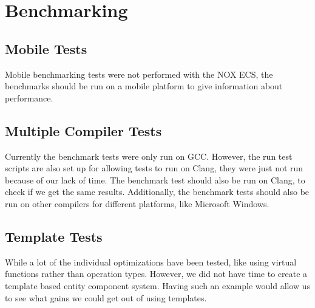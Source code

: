 \section{Benchmarking}
\subsection{Mobile Tests}
Mobile benchmarking tests were not performed with the NOX ECS,
the benchmarks should be run on a mobile platform to give information about performance.

\subsection{Multiple Compiler Tests}
Currently the benchmark tests were only run on GCC. However, the run test scripts are also
set up for allowing tests to run on Clang, they were just not run because of our lack of time.
The benchmark test should also be run on Clang, to check if we get the same results.
Additionally, the benchmark tests should also be run on other compilers for different platforms,
like Microsoft Windows.

\subsection{Template Tests}
While a lot of the individual optimizations have been tested, like using virtual functions rather than
operation types. However, we did not have time to create a template based entity component system.
Having such an example would allow us to see what gains we could get out of using templates.

